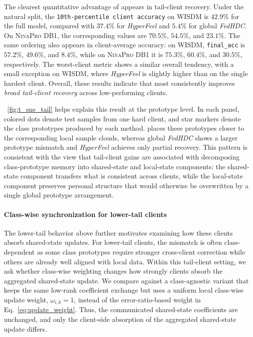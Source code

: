 \documentclass[lettersize,journal]{IEEEtran}
\newcommand{\rev}[1]{#1}
\begin{document}
The clearest quantitative advantage of \Design appears in tail-client recovery.
Under the natural split, the \texttt{10th-percentile client accuracy} on \textsc{WISDM} is $42.9\%$ for the full model, compared with $37.4\%$ for \textit{HyperFeel} and $5.4\%$ for global \textit{FedHDC}.
On \textsc{NinaPro DB1}, the corresponding values are $70.5\%$, $54.5\%$, and $23.1\%$.
The same ordering also appears in client-average accuracy: on \textsc{WISDM}, \texttt{final\_acc} is $57.2\%$, $49.6\%$, and $8.4\%$, while on \textsc{NinaPro DB1} it is $75.3\%$, $60.4\%$, and $30.5\%$, respectively.
The worst-client metric shows a similar overall tendency, with a small exception on \textsc{WISDM}, where \textit{HyperFeel} is slightly higher than \Design on the single hardest client.
Overall, these results indicate that \Design most consistently improves \emph{broad tail-client recovery} across low-performing clients.

\Figure~\ref{fig:t_sne_tail} helps explain this result at the prototype level.
In each panel, colored dots denote test samples from one hard client, and star markers denote the class prototypes produced by each method.
\Design places these prototypes closer to the corresponding \rev{local sample clouds}, whereas global \textit{FedHDC} shows a larger prototype mismatch and \textit{HyperFeel} achieves only partial recovery.
This pattern is consistent with the view that tail-client gains are associated with \rev{decomposing class-prototype memory into shared-state and local-state components}: the \rev{shared-state component} transfers what is consistent across clients, while the \rev{local-state component preserves personal structure} that would otherwise be overwritten by a single global prototype arrangement.


\paragraph{\rev{Class-wise synchronization for lower-tail clients}}
\rev{The lower-tail behavior above further motivates examining how these clients absorb shared-state updates.}
\rev{For lower-tail clients, the mismatch is often class-dependent as some class prototypes require stronger cross-client correction while others are already well aligned with local data.}
\rev{Within this tail-client setting, we ask whether class-wise weighting changes how strongly clients absorb the aggregated shared-state update.}
\rev{We compare against a class-agnostic variant that keeps the same low-rank coefficient exchange but uses a uniform local class-wise update weight, \(\omega_{i,k}=1\), instead of the error-ratio-based weight in Eq.~\eqref{eq:update_weight}.}
\rev{Thus, the communicated shared-state coefficients are unchanged, and only the client-side absorption of the aggregated shared-state update differs.}
\end{document}
